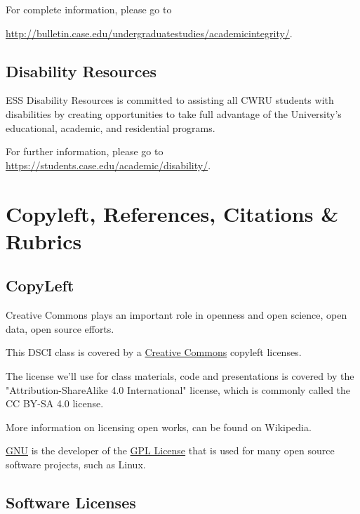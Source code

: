 \documentclass[11pt]{article} %
\begin{document}
For complete information, please go to

 \href{"http://bulletin.case.edu/undergraduatestudies/academicintegrity/"}{http://bulletin.case.edu/undergraduatestudies/academicintegrity/}. 

\subsection{Disability Resources}

ESS Disability Resources is committed to assisting all CWRU students with disabilities by creating opportunities to take full advantage of the University's educational, academic, and residential programs.  

For further information, please go to \href{"https://students.case.edu/academic/disability/''}{https://students.case.edu/academic/disability/}. 

\section{Copyleft, References, Citations  \& Rubrics}


\subsection{CopyLeft}


Creative Commons plays an important role in openness and open science, open data, open source efforts.  

This DSCI class \cite{french_dsci351-4511:_2015} is covered by a \href{"http://creativecommons.org/licenses/"}{Creative Commons}  \cite{commons_creative_2014} copyleft licenses.  

The license we'll use for class materials, code and presentations is covered by  the "Attribution-ShareAlike 4.0 International" license, which is commonly called the CC BY-SA 4.0 license. \cite{_creative_2015}
   
More information on licensing open works, can be found on Wikipedia. \cite{commons_creative_2014-1}

\href{"http://www.gnu.org/copyleft/gpl.html"}{GNU} \cite{gnu_gnu.org_2014} is the developer of the \href{"http://en.wikipedia.org/wiki/GNU_General_Public_License"}{GPL License} \cite{gpl_gnu_2014}  that is used for many open source software projects, such as Linux.  

\subsection{Software Licenses}
\end{document}
